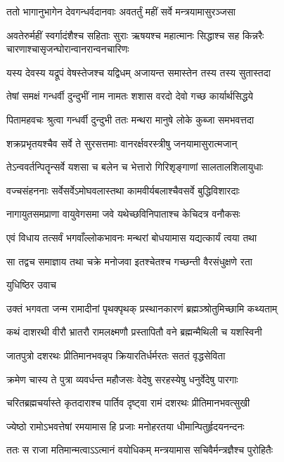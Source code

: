 \twolineshloka
{ततो भागानुभागेन देवगन्धर्वदानवाः}
{अवतर्तुं महीं सर्वे मन्त्रयामासुरञ्जसा}


\threelineshloka
{अवतेरुर्महीं स्वर्गादंशैश्च सहिताः सुराः}
{ऋषयश्च महात्मानः सिद्धाश्च सह किन्नरैः}
{चारणाश्चासृजन्घोरान्वानरान्वनचारिणः}


\twolineshloka
{यस्य देवस्य यद्रूपं वेषस्तेजश्च यद्विधम्}
{अजायन्त समास्तेन तस्य तस्य सुतास्तदा}


\twolineshloka
{तेषां समक्षं गन्धर्वी दुन्दुभीं नाम नामतः}
{शशास वरदो देवो गच्छ कार्यार्थसिद्धये}


\twolineshloka
{पितामहवचः श्रुत्वा गन्धर्वी दुन्दुभी ततः}
{मन्थरा मानुषे लोके कुब्जा समभवत्तदा}


\twolineshloka
{शक्रप्रभृतयश्चैव सर्वे ते सुरसत्तमाः}
{वानरर्क्षवरस्त्रीषु जनयामासुरात्मजान्}


\twolineshloka
{तेऽन्ववर्तन्पितॄन्सर्वे यशसा च बलेन च}
{भेत्तारो गिरिशृङ्गाणां सालतालशिलायुधाः}


\twolineshloka
{वज्चसंहननाः सर्वेसर्वेऽमोघवलास्तथा}
{कामवीर्यबलाश्चैवसर्वे बुद्धिविशारदाः}


\twolineshloka
{नागायुतसमप्राणा वायुवेगसमा जवे}
{यथेच्छविनिपाताश्च केचिदत्र वनौकसः}


\twolineshloka
{एवं विधाय तत्सर्वं भगवाँल्लोकभावनः}
{मन्थरां बोधयामास यद्यत्कार्यं त्वया तथा}


\twolineshloka
{सा तद्वच समाज्ञाय तथा चक्रे मनोजवा}
{इतश्चेतश्च गच्छन्ती वैरसंधुक्षणे रता}


\twolineshloka
{युधिष्ठिर उवाच}
{}


\twolineshloka
{उक्तं भगवता जन्म रामादीनां पृथक्पृथक्}
{प्रस्थानकारणं ब्रह्मञ्श्रोतुमिच्छामि कथ्यताम्}


\twolineshloka
{कथं दाशरथी वीरौ भ्रातरौ रामलक्ष्मणौ}
{प्रस्तापितौ वने ब्रह्मन्मैथिली च यशस्विनी}



\twolineshloka
{जातपुत्रो दशरथः प्रीतिमानभवन्नृप}
{क्रियारतिर्धर्मरतः सततं वृद्धसेविता}


\twolineshloka
{क्रमेण चास्य ते पुत्रा व्यवर्धन्त महौजसः}
{वेदेषु सरहस्येषु धनुर्वेदेषु पारगाः}


\twolineshloka
{चरितब्रह्मचर्यास्ते कृतदाराश्च पार्तिव}
{दृष्ट्वा रामं दशरथः प्रीतिमानभवत्सुखी}


\twolineshloka
{ज्येष्ठो रामोऽभवत्तेषां रमयामास हि प्रजाः}
{मनोहरतया धीमान्पितुर्हृदयनन्दनः}


\twolineshloka
{ततः स राजा मतिमान्मत्वाऽऽत्मानं वयोधिकम्}
{मन्त्रयामास सचिवैर्मन्त्रज्ञैश्च पुरोहितैः}


